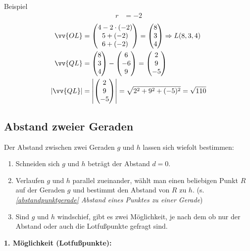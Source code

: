 \documentclass{article}
\begin{document}
\begin{boxx}[DarkBlue]{Beispiel}
\begin{align*}
        r &= -2 
    \end{align*}
    \begin{align*}
        \vv{OL} &= \begin{pmatrix}4-2\cdot (-2)\\5+(-2)\\6+(-2)\end{pmatrix} = \begin{pmatrix}8\\3\\4\end{pmatrix} \Rightarrow L(8,3,4) \\
        \vv{QL} &= \begin{pmatrix}8\\3\\4\end{pmatrix} - \begin{pmatrix}6\\-6\\9\end{pmatrix} = \begin{pmatrix}2\\9\\-5\end{pmatrix} \\
        |\vv{QL}| &= \left|\begin{pmatrix}2\\9\\-5\end{pmatrix}\right| = \sqrt{2^2+ 9^2 + (-5)^2} = \sqrt{110}
    \end{align*}
\end{boxx}
\newpage
\subsection{Abstand zweier Geraden}
Der Abstand zwischen zwei Geraden $g$ und $h$ lassen sich wiefolt bestimmen:
\begin{enumerate}
    \item Schneiden sich $g$ und $h$ beträgt der Abstand $d=0$.
    \item Verlaufen $g$ und $h$ parallel zueinander, wählt man einen beliebigen Punkt $R$ auf der Geraden $g$
    und bestimmt den Abstand von $R$ zu $h$. (s. \textit{\ref*{abstandpunktgerade} Abstand eines Punktes zu einer Gerade})
    \item Sind $g$ und $h$ windschief, gibt es zwei Möglichkeit, je nach dem ob nur der Abstand oder auch die Lotfußpunkte gefragt sind. 
\end{enumerate}
\textbf{1. Möglichkeit (Lotfußpunkte):}
\end{document}

